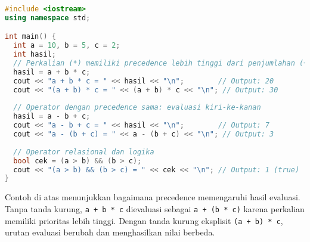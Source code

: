 \documentclass[../main.tex]{subfiles}
\begin{document}
\begin{lstlisting}[language=C++, caption={Precedence operator di C++}]
#include <iostream>
using namespace std;

int main() {
  int a = 10, b = 5, c = 2;
  int hasil;
  // Perkalian (*) memiliki precedence lebih tinggi dari penjumlahan (+)
  hasil = a + b * c;
  cout << "a + b * c = " << hasil << "\n";        // Output: 20
  cout << "(a + b) * c = " << (a + b) * c << "\n"; // Output: 30
  
  // Operator dengan precedence sama: evaluasi kiri-ke-kanan
  hasil = a - b + c;
  cout << "a - b + c = " << hasil << "\n";        // Output: 7
  cout << "a - (b + c) = " << a - (b + c) << "\n"; // Output: 3
  
  // Operator relasional dan logika
  bool cek = (a > b) && (b > c);
  cout << "(a > b) && (b > c) = " << cek << "\n"; // Output: 1 (true)
}
\end{lstlisting}

Contoh di atas menunjukkan bagaimana precedence memengaruhi hasil evaluasi. Tanpa tanda kurung, \texttt{a + b * c} dievaluasi sebagai \texttt{a + (b * c)} karena perkalian memiliki prioritas lebih tinggi. Dengan tanda kurung eksplisit \texttt{(a + b) * c}, urutan evaluasi berubah dan menghasilkan nilai berbeda.
\end{document}
